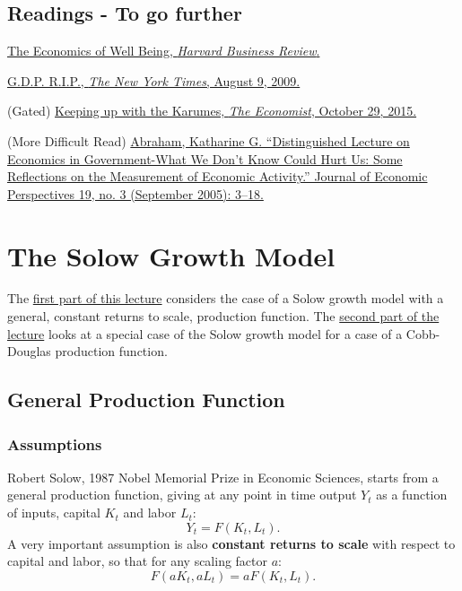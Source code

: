 \documentclass[]{book}
\theoremstyle{definition}
\theoremstyle{definition}
\theoremstyle{definition}
\theoremstyle{remark}
\begin{document}
\section*{Readings - To go further}\label{readings---to-go-further}

\href{https://hbr.org/2012/01/the-economics-of-well-being}{The Economics
of Well Being, \emph{Harvard Business Review}.}

\href{https://search.proquest.com/hnpnewyorktimes/docview/1030670685/A9EF0C9A254D4699PQ/1?accountid=14512}{G.D.P.
R.I.P., \emph{The New York Times}, August 9, 2009.}

(Gated)
\href{https://www.economist.com/news/finance-and-economics/21677223-new-study-shows-money-can-buy-you-happinessbut-only-fleetingly-others}{Keeping
up with the Karumes, \emph{The Economist}, October 29, 2015.}

(More Difficult Read)
\href{https://doi.org/10.1257/089533005774357833}{Abraham, Katharine G.
``Distinguished Lecture on Economics in Government-What We Don't Know
Could Hurt Us: Some Reflections on the Measurement of Economic
Activity.'' Journal of Economic Perspectives 19, no. 3 (September 2005):
3--18.}

\hypertarget{solow}{\chapter{The Solow Growth Model}\label{solow}}

The \protect\hyperlink{general-production-f}{first part of this lecture}
considers the case of a Solow growth model with a general, constant
returns to scale, production function. The
\protect\hyperlink{cobb}{second part of the lecture} looks at a special
case of the Solow growth model for a case of a Cobb-Douglas production
function.

\hypertarget{general-production-f}{\section{General Production
Function}\label{general-production-f}}

\subsection{Assumptions}\label{assumptions}

Robert Solow, 1987 Nobel Memorial Prize in Economic Sciences, starts
from a general production function, giving at any point in time output
\(Y_t\) as a function of inputs, capital \(K_t\) and labor \(L_t\):
\[Y_t=F\left(K_t,L_t\right).\] A very important assumption is also
\textbf{constant returns to scale} with respect to capital and labor, so
that for any scaling factor \(a\): \[F(aK_t, aL_t) = aF(K_t, L_t).\]
\end{document}
